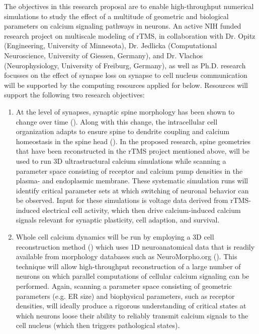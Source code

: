 The objectives in this research proposal are to enable high-throughput numerical simulations to study the effect of a multitude of geometric and biological parameters on calcium signaling pathways in neurons. An active NIH funded research project on multiscale modeling of rTMS, in collaboration with Dr. Opitz (Engineering, University of Minnesota), Dr. Jedlicka (Computational Neuroscience, University of Giessen, Germany), and Dr. Vlachos (Neurophysiology, University of Freiburg, Germany), as well as Ph.D. research focusses on the effect of synapse loss on synapse to cell nucleus communication will be supported by the computing resources applied for below. Resources will support the following two research objectives: 
\begin{enumerate}
\item At the level of synapses, synaptic spine morphology has been shown to change over time (\cite{Segal2014,Maggio2014,Verkhratsky2005,Finch2012,Jedlicka2017}). Along with this change, the intracellular cell organization adapts to ensure spine to dendrite coupling and calcium homeostasis in the spine head (\cite{Breit2018b}). In the proposed research, spine geometries that have been reconstructed in the rTMS project mentioned above, will be used to run 3D ultrastructural calcium simulations while scanning a parameter space consisting of receptor and calcium pump densities in the plasma- and endoplasmic membrane. These systematic simulation runs will identify critical parameter sets at which switching of neuronal behavior can be observed. Input for these simulations is voltage data derived from rTMS-induced electrical cell activity, which then drive calcium-induced calcium signals relevant for synaptic plasticity, cell adaption, and survival. 

\item Whole cell calcium dynamics will be run by employing a 3D cell reconstruction method (\cite{Moerschel2017}) which uses 1D neuroanatomical data that is readily available from morphology databases such as NeuroMorpho.org (\cite{Ascoli2007}). This technique will allow high-throughput reconstruction of a large number of neurons on which parallel computations of cellular calcium signaling can be performed. Again, scanning a parameter space consisting of geometric parameters (e.g. ER size) and biophysical parameters, such as receptor densities, will ideally produce a rigorous understanding of critical states at which neurons loose their ability to reliably transmit calcium signals to the cell nucleus (which then triggers pathological states). 
\end{enumerate}
